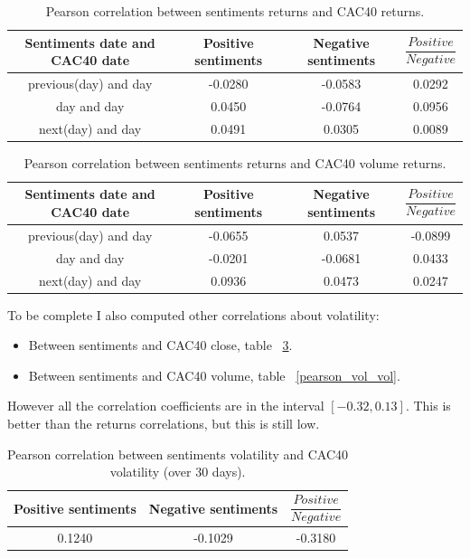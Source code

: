 \documentclass[12pt]{report}
\begin{document}
\begin{table}
	\begin{tabular}{|c || c | c | c|}
		\hline
		Sentiments date and CAC40 date & Positive sentiments & Negative sentiments & $\dfrac{Positive}{Negative}$\\
		\hline
		previous(day) and day & -0.0280 & -0.0583 & 0.0292\\
		\hline
		day and day & 0.0450 & -0.0764 & 0.0956\\
		\hline
		next(day) and day & 0.0491 & 0.0305 & 0.0089\\
		\hline
	\end{tabular}

	\caption{Pearson correlation between sentiments returns and CAC40 returns.\label{pearson_cac}}
\end{table}

\begin{table}
	\begin{tabular}{|c || c | c | c|}
		\hline
		Sentiments date and CAC40 date & Positive sentiments & Negative sentiments & $\dfrac{Positive}{Negative}$\\
		\hline
		previous(day) and day & -0.0655 & 0.0537 & -0.0899\\
		\hline
		day and day & -0.0201 & -0.0681 & 0.0433\\
		\hline
		next(day) and day & 0.0936 & 0.0473 & 0.0247\\
		\hline
	\end{tabular}

	\caption{Pearson correlation between sentiments returns and CAC40 volume returns.\label{pearson_volume}}
\end{table}

To be complete I also computed other correlations about volatility:
\begin{itemize}
	\item Between sentiments and CAC40 close, table ~\ref{pearson_vol_cac}.
	\item Between sentiments and CAC40 volume, table ~\ref{pearson_vol_vol}.
\end{itemize}
However all the correlation coefficients are in the interval $[-0.32, 0.13]$. This is better than the returns correlations, but this is still low.

\begin{table}
	\begin{center}
		\begin{tabular}{|c | c | c|}
			\hline
			Positive sentiments & Negative sentiments & $\dfrac{Positive}{Negative}$\\
			\hline
			0.1240 & -0.1029 & -0.3180\\
			\hline
		\end{tabular}
	\end{center}

	\caption{Pearson correlation between sentiments volatility and CAC40 volatility (over 30 days).\label{pearson_vol_cac}}
\end{table}
\end{document}
